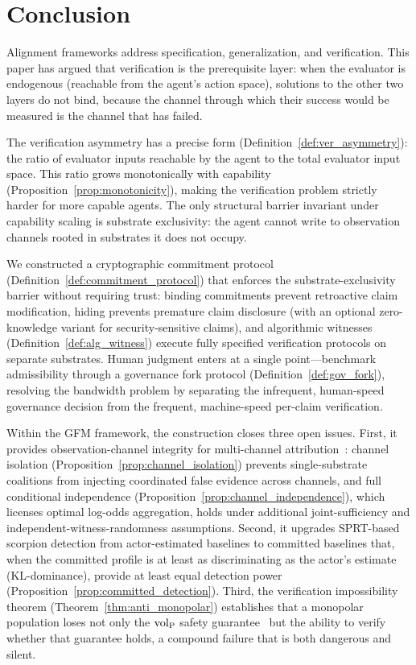 \section{Conclusion}
\label{sec:conclusion}

Alignment frameworks address specification, generalization, and
verification.  This paper has argued that verification is the
prerequisite layer: when the evaluator is endogenous (reachable from
the agent's action space), solutions to the other two layers do not
bind, because the channel through which their success would be measured
is the channel that has failed.

The verification asymmetry has a precise form
(Definition~\ref{def:ver_asymmetry}): the ratio of evaluator inputs
reachable by the agent to the total evaluator input space.  This ratio
grows monotonically with capability
(Proposition~\ref{prop:monotonicity}), making the verification problem
strictly harder for more capable agents.  The only structural barrier
invariant under capability scaling is substrate exclusivity: the agent
cannot write to observation channels rooted in substrates it does not
occupy.

We constructed a cryptographic commitment protocol
(Definition~\ref{def:commitment_protocol}) that enforces the
substrate-exclusivity barrier without requiring trust: binding
commitments prevent retroactive claim modification, hiding prevents
premature claim disclosure (with an optional zero-knowledge variant
for security-sensitive claims), and algorithmic witnesses
(Definition~\ref{def:alg_witness}) execute fully specified verification
protocols on separate substrates.  Human judgment enters at a single
point---benchmark admissibility through a governance fork protocol
(Definition~\ref{def:gov_fork}), resolving the bandwidth problem by
separating the infrequent, human-speed governance decision from the
frequent, machine-speed per-claim verification.

Within the GFM framework, the construction closes three open issues.
First, it provides observation-channel integrity for
multi-channel attribution~\citep{lasser2026scm}: channel
isolation (Proposition~\ref{prop:channel_isolation}) prevents
single-substrate coalitions from injecting coordinated false evidence
across channels, and full conditional
independence (Proposition~\ref{prop:channel_independence}), which
licenses optimal log-odds aggregation, holds under
additional joint-sufficiency and independent-witness-randomness
assumptions.  Second, it upgrades
SPRT-based scorpion detection from actor-estimated baselines to committed
baselines that, when the committed profile is at least as discriminating
as the actor's estimate (KL-dominance), provide at least equal detection
power (Proposition~\ref{prop:committed_detection}).  Third, the verification
impossibility theorem (Theorem~\ref{thm:anti_monopolar}) establishes
that a monopolar population loses not only the ${\operatorname{vol}_{\mathrm{P}}}$ safety
guarantee~\citep{lasser2026horizon} but the ability to verify whether
that guarantee holds, a compound failure that is both dangerous and
silent.

